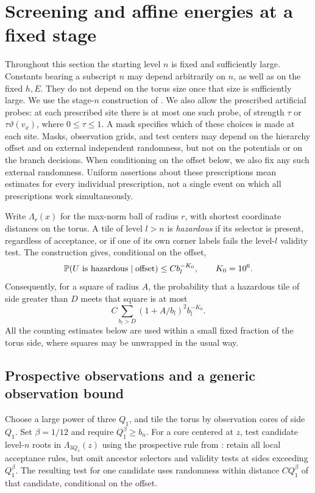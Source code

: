 \section{Screening and affine energies at a fixed stage}
\label{sec:screening}

Throughout this section the starting level $n$ is fixed and sufficiently
large. Constants bearing a subscript $n$ may depend arbitrarily on $n$,
as well as on the fixed $h,E$. They do not depend on the torus size once
that size is sufficiently large. We use the stage-$n$ construction of
. We also allow the prescribed artificial probes:
at each prescribed site there is at most one such probe, of strength
$\tau$ or $\tau\vartheta(v_x)$, where $0\leq\tau\leq1$.
A mask specifies which of these choices is made at each site.
Masks, observation grids, and test centers may depend on the hierarchy
offset and on external independent randomness, but not on the potentials
or on the branch decisions. When conditioning on the offset below, we
also fix any such external randomness. Uniform assertions about these
prescriptions mean estimates for every individual prescription, not a
single event on which all prescriptions work simultaneously.

Write $\Lambda_r(x)$ for the max-norm ball of radius $r$, with shortest
coordinate distances on the torus. A tile of level $l>n$ is
\emph{hazardous} if its selector is present, regardless of acceptance,
or if one of its own corner labels fails the level-$l$ validity test.
The construction gives, conditional on the offset,
\begin{equation}
 \mathbb P(U\text{ is hazardous}\mid\text{offset})
 \leq C b_l^{-K_0},\qquad K_0=10^6.
 \label{screen:hazard}
\end{equation}
Consequently, for a square of radius $A$, the probability that a
hazardous tile of side greater than $D$ meets that square is at most
\begin{equation}
 C\sum_{b_l>D}(1+A/b_l)^2b_l^{-K_0}.
 \label{screen:hazard-count}
\end{equation}
All the counting estimates below are used within a small fixed fraction
of the torus side, where squares may be unwrapped in the usual way.

\subsection{Prospective observations and a generic observation bound}

Choose a large power of three $Q_1$, and tile the torus by observation
cores of side $Q_1$. Set $\beta=1/12$ and require $Q_1^\beta\geq b_n$.
For a core centered at $z$, test candidate level-$n$ roots in
$\Lambda_{3Q_1}(z)$ using the prospective rule from
: retain all local acceptance rules, but omit
ancestor selectors and validity tests at sides exceeding $Q_1^\beta$.
The resulting test for one candidate uses randomness within distance
$C Q_1^\beta$ of that candidate, conditional on the offset.

